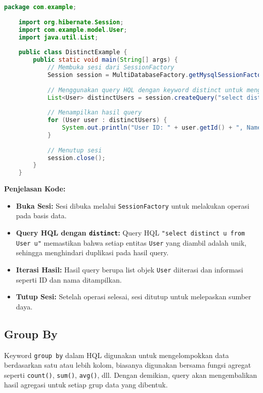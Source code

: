 \begin{lstlisting}[language=Java, style=JavaStyle]
	package com.example;
	
	import org.hibernate.Session;
	import com.example.model.User;
	import java.util.List;
	
	public class DistinctExample {
		public static void main(String[] args) {
			// Membuka sesi dari SessionFactory
			Session session = MultiDatabaseFactory.getMysqlSessionFactory().openSession();
			
			// Menggunakan query HQL dengan keyword distinct untuk mengambil entitas User secara unik
			List<User> distinctUsers = session.createQuery("select distinct u from User u", User.class).list();
			
			// Menampilkan hasil query
			for (User user : distinctUsers) {
				System.out.println("User ID: " + user.getId() + ", Name: " + user.getName());
			}
			
			// Menutup sesi
			session.close();
		}
	}
\end{lstlisting}

\textbf{Penjelasan Kode:}
\begin{itemize}
	\item \textbf{Buka Sesi:} Sesi dibuka melalui \texttt{SessionFactory} untuk melakukan operasi pada basis data.
	\item \textbf{Query HQL dengan \texttt{distinct}:} Query HQL \texttt{"select distinct u from User u"} memastikan bahwa setiap entitas \texttt{User} yang diambil adalah unik, sehingga menghindari duplikasi pada hasil query.
	\item \textbf{Iterasi Hasil:} Hasil query berupa list objek \texttt{User} diiterasi dan informasi seperti ID dan nama ditampilkan.
	\item \textbf{Tutup Sesi:} Setelah operasi selesai, sesi ditutup untuk melepaskan sumber daya.
\end{itemize}



\subsection{Group By}

Keyword \texttt{group by} dalam HQL digunakan untuk mengelompokkan data berdasarkan satu atau lebih kolom, biasanya digunakan bersama fungsi agregat seperti \texttt{count()}, \texttt{sum()}, \texttt{avg()}, dll. Dengan demikian, query akan mengembalikan hasil agregasi untuk setiap grup data yang dibentuk.

